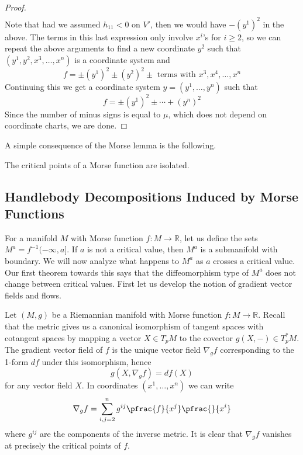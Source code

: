 \begin{proof}
\begin{align*}
\end{align*}
Note that had we assumed $h_{11} < 0$ on $V'$, then we would have $-(y^1)^2$ in the above. The terms in this last expression only involve $x^i$'s for $i \geq 2$, so we can repeat the above arguments to find a new coordinate $y^2$ such that $(y^1,y^2,x^3,\ldots,x^n)$ is a coordinate system and
\[ f = \pm (y^1)^2 \pm (y^2)^2 \pm \text{ terms with } x^3, x^4, \ldots, x^n \]
Continuing this we get a coordinate system $y=(y^1,\ldots,y^n)$ such that
\[ f = \pm (y^1)^2 \pm  \cdots + (y^n)^2 \]
Since the number of minus signs is equal to $\mu$, which does not depend on coordinate charts, we are done.
\end{proof}

A simple consequence of the Morse lemma is the following.

\begin{cor}
The critical points of a Morse function are isolated.
\end{cor}





\subsection{Handlebody Decompositions Induced by Morse Functions}
\label{Handlebody Decompositions Induced by Morse Functions}


For a manifold $M$ with Morse function $f : M \rightarrow \mathbb R$, let us define the sets $M^a = f^{-1}(-\infty,a]$. If $a$ is not a critical value, then $M^a$ is a submanifold with boundary. We will now analyze what happens to $M^a$ as $a$ crosses a critical value. Our first theorem towards this says that the diffeomorphism type of $M^a$ does not change between critical values. First let us develop the notion of gradient vector fields and flows.

Let $(M,g)$ be a Riemannian manifold with Morse function $f : M \rightarrow \mathbb R$. Recall that the metric gives us a canonical isomorphism of tangent spaces with cotangent spaces by mapping a vector $X \in T_p M$ to the covector $g(X,-) \in T_p^* M$. The gradient vector field of $f$ is the unique vector field $\nabla_g f$ corresponding to the 1-form $df$ under this isomorphism, hence
\[ g(X,\nabla_g f) = df(X) \]
for any vector field $X$. In coordinates $(x^1,\ldots,x^n)$ we can write
\[ \nabla_g f = \sum_{i,j = 2}^n g^{ij} \pfrac{f}{x^j} \pfrac{}{x^i} \]
where $g^{ij}$ are the components of the inverse metric. It is clear that $\nabla_g f$ vanishes at precisely the critical points of $f$. 


